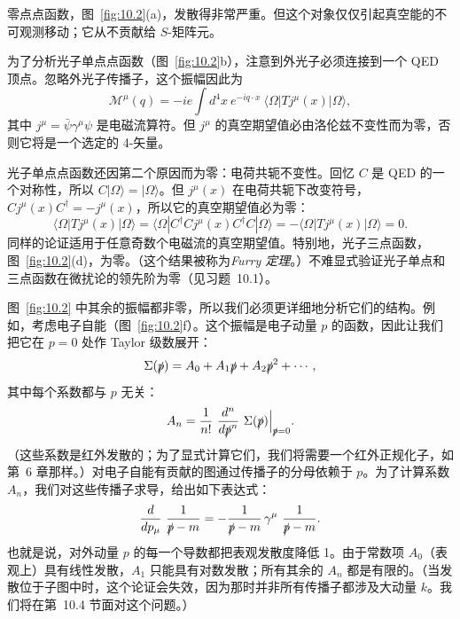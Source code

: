 零点点函数，图~\ref{fig:10.2}(a)，发散得非常严重。但这个对象仅仅引起真空能的不可观测移动；它从不贡献给 $S$-矩阵元。

为了分析光子单点点函数（图~\ref{fig:10.2}b），注意到外光子必须连接到一个 QED 顶点。忽略外光子传播子，这个振幅因此为
\begin{equation}
  \mathcal{M}^\mu(q) = -ie\int d^4x\ e^{-iq\cdot x}\
    \langle\Omega|T j^\mu(x)|\Omega\rangle ,
  \label{eq:10.5}
\end{equation}
其中 $j^\mu = \bar{\psi}\gamma^\mu\psi$ 是电磁流算符。但 $j^\mu$ 的真空期望值必由洛伦兹不变性而为零，否则它将是一个选定的 4-矢量。

光子单点点函数还因第二个原因而为零：电荷共轭不变性。回忆 $C$ 是 QED 的一个对称性，所以 $C|\Omega\rangle = |\Omega\rangle$。但 $j^\mu(x)$ 在电荷共轭下改变符号，$Cj^\mu(x)C^{\dagger} = -j^\mu(x)$，所以它的真空期望值必为零：
\begin{equation}
  \langle\Omega|T j^\mu(x)|\Omega\rangle
  = \langle\Omega|C^{\dagger}Cj^\mu(x)C^{\dagger}C|\Omega\rangle
  = -\langle\Omega|T j^\mu(x)|\Omega\rangle = 0 .
\end{equation}
同样的论证适用于任意奇数个电磁流的真空期望值。特别地，光子三点函数，图~\ref{fig:10.2}(d)，为零。（这个结果被称为\emph{Furry 定理}。）不难显式验证光子单点和三点函数在微扰论的领先阶为零（见习题~10.1）。

图~\ref{fig:10.2} 中其余的振幅都非零，所以我们必须更详细地分析它们的结构。例如，考虑电子自能（图~\ref{fig:10.2}f）。这个振幅是电子动量 $p$ 的函数，因此让我们把它在 $p = 0$ 处作 Taylor 级数展开：
\begin{equation}
  \Sigma(\slashed{p}) = A_0 + A_1\slashed{p} + A_2\slashed{p}^2 + \cdots ,
\end{equation}
其中每个系数都与 $p$ 无关：
\begin{equation}
  A_n = \frac{1}{n!}\ \frac{d^n}{d\slashed{p}^n}\ \Sigma(\slashed{p})
    \Big|_{\slashed{p}=0} .
\end{equation}
（这些系数是红外发散的；为了显式计算它们，我们将需要一个红外正规化子，如第~6 章那样。）对电子自能有贡献的图通过传播子的分母依赖于 $p$。为了计算系数 $A_n$，我们对这些传播子求导，给出如下表达式：
\begin{equation}
  \frac{d}{dp_\mu}\ \frac{1}{\slashed{p}-m} = -\frac{1}{\slashed{p}-m}\,
    \gamma^\mu\ \frac{1}{\slashed{p}-m} .
\end{equation}
也就是说，对外动量 $p$ 的每一个导数都把表观发散度降低 1。由于常数项 $A_0$（表观上）具有线性发散，$A_1$ 只能具有对数发散；所有其余的 $A_n$ 都是有限的。（当发散位于子图中时，这个论证会失效，因为那时并非所有传播子都涉及大动量 $k$。我们将在第~10.4 节面对这个问题。）

